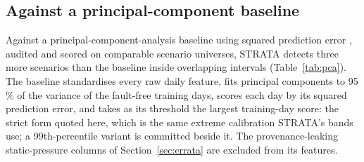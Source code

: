\documentclass[11pt,letterpaper]{article}
\begin{document}
\subsection{Against a principal-component baseline}

Against a principal-component-analysis baseline using squared prediction error \cite{wang2004pcaahu,jackson1979spe}, audited and scored on comparable scenario universes, STRATA detects three more scenarios than the baseline inside overlapping intervals (Table~\ref{tab:pca}). The baseline standardises every raw daily feature, fits principal components to 95\,\% of the variance of the fault-free training days, scores each day by its squared prediction error, and takes as its threshold the largest training-day score: the strict form quoted here, which is the same extreme calibration STRATA's bands use; a 99th-percentile variant is committed beside it. The provenance-leaking static-pressure columns of Section~\ref{sec:errata} are excluded from its features.
\end{document}
